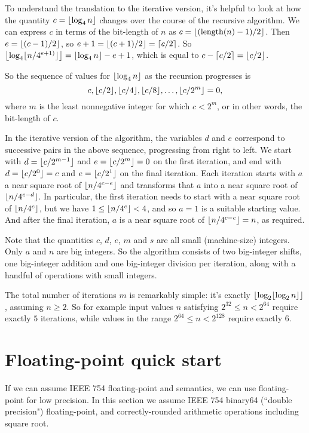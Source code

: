 \documentclass[a4paper]{article}
\DeclarePairedDelimiter\floor{\lfloor}{\rfloor}
\DeclarePairedDelimiter\ceil{\lceil}{\rceil}
\DeclareMathOperator{\length}{length}
\theoremstyle{plain}
\theoremstyle{definition}
\begin{document}
To understand the translation to the iterative version, it's helpful to look at
how the quantity $c = \floor{\log_4 n}$ changes over the course of the
recursive algorithm. We can express $c$ in terms of the bit-length of $n$ as $c
= \floor{(\length(n) - 1) / 2}$. Then $e = \floor{(c-1)/2}$, so $e+1 =
\floor{(c+1)/2} = \ceil{c/2}$. So
$\floor*{\log_4\floor{n/4^{e+1)}}} = \floor{\log_4 n} - {e + 1}$,
which is equal to $c - \ceil{c/2} = \floor{c/2}$.

So the sequence of values for $\floor{\log_4 n}$ as the recursion progresses
is
$$c, \floor{c/2}, \floor{c/4}, \floor{c/8}, \dots, \floor{c/2^m} = 0,$$
where $m$ is the least nonnegative integer for which $c < 2^m$, or in
other words, the bit-length of $c$.

In the iterative version of the algorithm, the variables $d$ and $e$ correspond
to successive pairs in the above sequence, progressing from right to left. We
start with $d=\floor{c/2^{m-1}}$ and $e=\floor{c/2^m}=0$ on the first
iteration, and end with $d=\floor{c/2^0}=c$ and $e=\floor{c/2^1}$ on the final
iteration. Each iteration starts with $a$ a near square root of $\floor{n
/4^{c-e}}$ and transforms that $a$ into a near square root of $\floor{n /
4^{c-d}}$. In particular, the first iteration needs to start with a near square root of
$\floor{n/4^c}$, but we have $1 \le \floor{n/4^c} < 4$, and so $a = 1$ is
a suitable starting value. And after the final iteration, $a$ is a near square root
of $\floor{n/4^{c-c}} = n$, as required.

Note that the quantities $c$, $d$, $e$, $m$ and $s$ are all small (machine-size)
integers. Only $a$ and $n$ are big integers. So the algorithm consists of
two big-integer shifts, one big-integer addition and one big-integer division per
iteration, along with a handful of operations with small integers.

The total number of iterations $m$ is remarkably simple: it's exactly
$\floor{\log_2 \floor{\log_2 n}}$, assuming $n\ge 2$. So for example input
values $n$ satisfying $2^{32} \le n < 2^{64}$ require exactly $5$ iterations,
while values in the range $2^{64} \le n < 2^{128}$ require exactly $6$.

\section{Floating-point quick start}

If we can assume IEEE 754 floating-point and semantics, we can use
floating-point for low precision. In this section we assume IEEE 754
binary64 (``double precision") floating-point, and correctly-rounded
arithmetic operations including square root.
\end{document}
